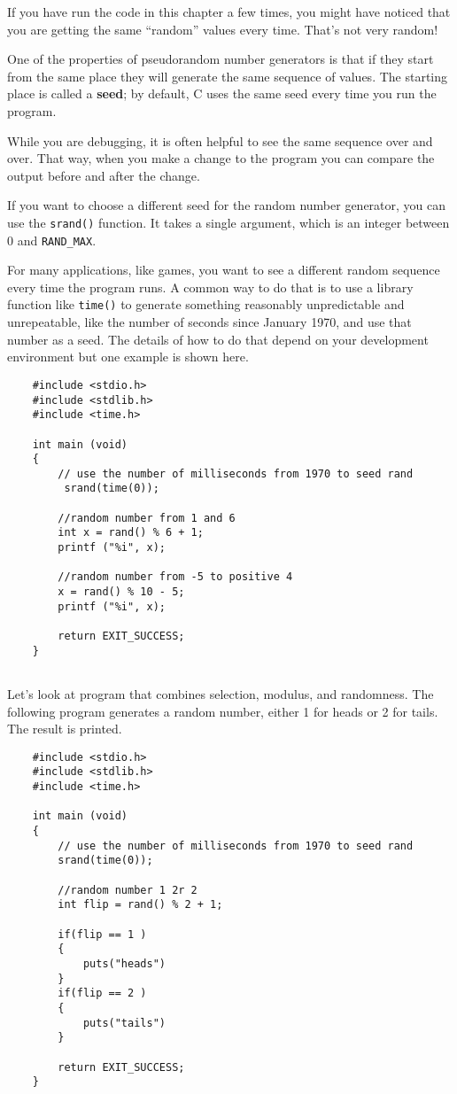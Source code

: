 If you have run the code in this chapter a few times, you might
have noticed that you are getting the same ``random'' values
every time.  That's not very random!

One of the properties of pseudorandom number generators is that
if they start from the same place they will generate
the same sequence of values.  The starting place is called
a {\bf seed}; by default, C uses
the same seed every time you run the program.

While you are debugging, it is often helpful to
see the same sequence over and over.  That way, when you make
a change to the program you can compare the output before and
after the change.

If you want to choose a different seed for the random number
generator, you can use the {\tt srand()} function.  It takes
a single argument, which is an integer between 0 and {\tt RAND\_MAX}.

For many applications, like games, you want to see a different
random sequence every time the program runs.  A common way to
do that is to use a library function like {\tt time()}
to generate something reasonably unpredictable
and unrepeatable, like the number of seconds since January
1970, and use that number as a seed.  The details
of how to do that depend on your development environment but one example is shown here.

\begin{verbatim}
	#include <stdio.h>
	#include <stdlib.h>
	#include <time.h>
	
	int main (void)
	{
	 	// use the number of milliseconds from 1970 to seed rand
	 	 srand(time(0)); 
		
	 	//random number from 1 and 6 
	  	int x = rand() % 6 + 1;
	  	printf ("%i", x);
		
	  	//random number from -5 to positive 4
	  	x = rand() % 10 - 5;
	  	printf ("%i", x);
		
	  	return EXIT_SUCCESS;
	}
	
\end{verbatim}


Let's look at program that combines selection, modulus, and randomness. The following program generates a random number, either 1 for heads or 2 for tails. The result is printed.

\begin{verbatim}
 	#include <stdio.h>
 	#include <stdlib.h>
 	#include <time.h>
	
 	int main (void)
 	{
 		// use the number of milliseconds from 1970 to seed rand
	 	srand(time(0)); 
		
	 	//random number 1 2r 2
	 	int flip = rand() % 2 + 1;
 	
		if(flip == 1 )
		{
			puts("heads")
		}
		if(flip == 2 )
		{
	 	    puts("tails")
		}
		
	 	return EXIT_SUCCESS;
 	}
	
\end{verbatim}



